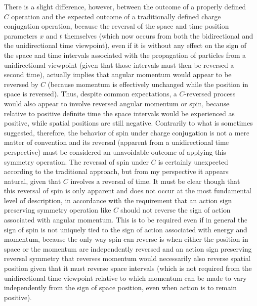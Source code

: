 \documentclass[notitlepage,12pt]{report}
\begin{document}
There is a slight difference, however, between the outcome of a properly defined $C$ operation and the expected outcome of a traditionally defined charge conjugation operation, because the reversal of the space and time position parameters $x$ and $t$ themselves (which now occurs from both the bidirectional and the unidirectional time viewpoint), even if it is without any effect on the sign of the space and time intervals associated with the propagation of particles from a unidirectional viewpoint (given that those intervals must then be reversed a second time), actually implies that angular momentum would appear to be reversed by $C$ (because momentum is effectively unchanged while the position in space is reversed). Thus, despite common expectations, a $C$-reversed process would also appear to involve reversed angular momentum or spin, because relative to positive definite time the space intervals would be experienced as positive, while spatial positions are still negative. Contrarily to what is sometimes suggested, therefore, the behavior of spin under charge conjugation is not a mere matter of convention and its reversal (apparent from a unidirectional time perspective) must be considered an unavoidable outcome of applying this symmetry operation. The reversal of spin under $C$ is certainly unexpected according to the traditional approach, but from my perspective it appears natural, given that $C$ involves a reversal of time. It must be clear though that this reversal of spin is only apparent and does not occur at the most fundamental level of description, in accordance with the requirement that an action sign preserving symmetry operation like $C$ should not reverse the sign of action associated with angular momentum. This is to be required even if in general the sign of spin is not uniquely tied to the sign of action associated with energy and momentum, because the only way spin can reverse is when either the position in space or the momentum are independently reversed and an action sign preserving reversal symmetry that reverses momentum would necessarily also reverse spatial position given that it must reverse space intervals (which is not required from the unidirectional time viewpoint relative to which momentum can be made to vary independently from the sign of space position, even when action is to remain positive).
\end{document}
